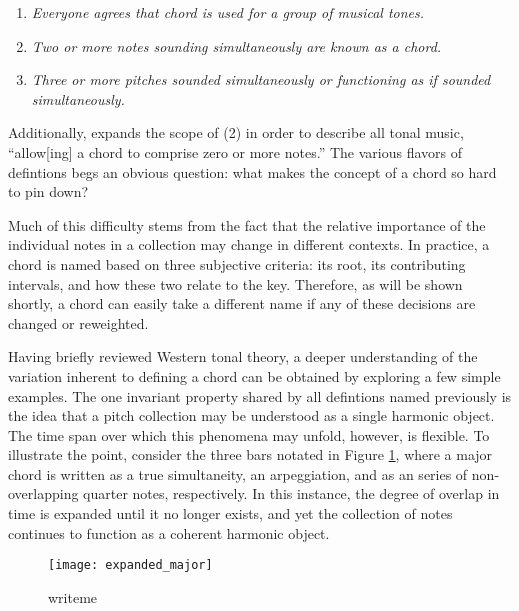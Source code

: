 \begin{enumerate}
\item \emph{Everyone agrees that \emph{chord} is used for a group of musical tones.}
\item \emph{Two or more notes sounding simultaneously are known as a chord.}
\item \emph{Three or more pitches sounded simultaneously or functioning as if sounded simultaneously.}
\end{enumerate}

Additionally, \cite{Harte2010} expands the scope of (2) in order to describe all tonal music, ``allow[ing] a chord to comprise zero or more notes.''
The various flavors of defintions begs an obvious question: what makes the concept of a chord so hard to pin down?

Much of this difficulty stems from the fact that the relative importance of the individual notes in a collection may change in different contexts.
In practice, a chord is named based on three subjective criteria: its root, its contributing intervals, and how these two relate to the key.
Therefore, as will be shown shortly, a chord can easily take a different name if any of these decisions are changed or reweighted.

Having briefly reviewed Western tonal theory, a deeper understanding of the variation inherent to defining a chord can be obtained by exploring a few simple examples.
The one invariant property shared by all defintions named previously is the idea that a pitch collection may be understood as a single harmonic object.
The time span over which this phenomena may unfold, however, is flexible.
To illustrate the point, consider the three bars notated in Figure \ref{fig:expanded_major}, where a major chord is written as a true simultaneity, an arpeggiation, and as an series of non-overlapping quarter notes, respectively.
In this instance, the degree of overlap in time is expanded until it no longer exists, and yet the collection of notes continues to function as a coherent harmonic object.

\begin{figure}[t]
\centering
\texttt{[image: expanded\_major]}
\caption{writeme}
\label{fig:expanded_major}
\end{figure}

